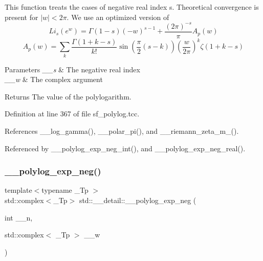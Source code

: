 This function treats the cases of negative real index s. Theoretical convergence is present for $ |w| < 2\pi $. We use an optimized version of \[ Li_s(e^w) = \Gamma(1-s)(-w)^{s-1} + \frac{(2\pi)^{-s}}{\pi} A_p(w) \] \[ A_p(w) = \sum_k \frac{\Gamma(1+k-s)}{k!} \sin\left(\frac{\pi}{2} (s-k)\right) \left(\frac{w}{2\pi}\right)^k \zeta(1+k-s) \] 
\begin{DoxyParams}{Parameters}
{\em \+\_\+\+\_\+s} & The negative real index \\
\hline
{\em \+\_\+\+\_\+w} & The complex argument \\
\hline
\end{DoxyParams}
\begin{DoxyReturn}{Returns}
The value of the polylogarithm. 
\end{DoxyReturn}


Definition at line 367 of file sf\+\_\+polylog.\+tcc.



References \+\_\+\+\_\+log\+\_\+gamma(), \+\_\+\+\_\+polar\+\_\+pi(), and \+\_\+\+\_\+riemann\+\_\+zeta\+\_\+m\+\_().



Referenced by \+\_\+\+\_\+polylog\+\_\+exp\+\_\+neg\+\_\+int(), and \+\_\+\+\_\+polylog\+\_\+exp\+\_\+neg\+\_\+real().

\mbox{\label{namespacestd_1_1____detail_a313ae48e1c4ed3c5296c8e45614af3d5}} 
\subsubsection{\texorpdfstring{\+\_\+\+\_\+polylog\+\_\+exp\+\_\+neg()}{\_\_polylog\_exp\_neg()}\hspace{0.1cm}{\footnotesize\ttfamily [2/2]}}
{\footnotesize\ttfamily template$<$typename \+\_\+\+Tp $>$ \\
std\+::complex$<$\+\_\+\+Tp$>$ std\+::\+\_\+\+\_\+detail\+::\+\_\+\+\_\+polylog\+\_\+exp\+\_\+neg (\begin{DoxyParamCaption}\item[{int}]{\+\_\+\+\_\+n,  }\item[{std\+::complex$<$ \+\_\+\+Tp $>$}]{\+\_\+\+\_\+w }\end{DoxyParamCaption})}

